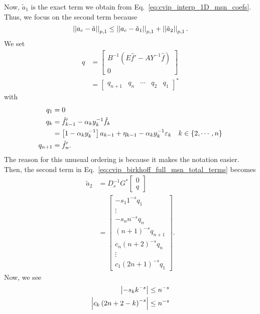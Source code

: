 Now, $\tilde{a}_{1}$ is the exact term we obtain
from Eq.~\eqref{eq:cvip_interp_1D_msn_coefs}. Thus, we focus on
the second term because
%
\begin{equation}
    \left| \left| a_{c} - \tilde{a} \right| \right|_{p,1}
        \le \left| \left| a_{c}-\tilde{a}_{1} \right| \right|_{p,1} + \left| \left| \tilde{a}_{2} \right| \right|_{p,1}.
\end{equation}
%
We set
%
\begin{align}
    q &= \begin{bmatrix}
        B^{-1}(E\hat{f}' - AY^{-1}\hat{f}) \\ 0\end{bmatrix} \nonumber\\
    &= \begin{bmatrix} q_{n+1} & q_{n} & \cdots & q_{2} &q_{1}\end{bmatrix}^{*}
\end{align}
%
with
%
\begin{align}
    q_{1} &= 0 \nonumber\\
    q_{k} &= \hat{f}_{k-1}' - \alpha_{k}y_{k}^{-1}\hat{f}_{k} \nonumber\\
    &=\left[ 1-\alpha_{k}y_{k}^{-1} \right]a_{k-1}
        + \eta_{k-1} - \alpha_{k}y_{k}^{-1}\varepsilon_{k}
        \quad k\in\left\{ 2,\cdots,n \right\} \nonumber\\
    q_{n+1} &= \hat{f}_{n}'.
\end{align}
%
The reason for this unusual ordering is because it makes the notation easier.
Then, the second term in Eq.~\eqref{eq:cvip_birkhoff_full_msn_total_terms}
becomes
%
\begin{align}
    \tilde{a}_{2} &= D_{s}^{-1}G^{*} \begin{bmatrix} 0 \\ q \end{bmatrix}
        \nonumber\\
    &= \begin{bmatrix} -s_{1}1^{-s}q_{1} \\ \vdots \\ -s_{n}n^{-s}q_{n} \\
        (n+1)^{-s}q_{n+1} \\ c_{n}(n+2)^{-s}q_{n} \\ \vdots \\
        c_{1}(2n+1)^{-s}q_{1} \end{bmatrix}.
    \label{eq:cvip_birkhoff_1D_full_q_coefs}
\end{align}
%
Now, we see
%
\begin{align}
    \left| -s_{k}k^{-s} \right| &\le n^{-s} \nonumber\\
    \left| c_{k}\left( 2n+2-k \right)^{-s} \right| & \le n^{-s}
\end{align}
